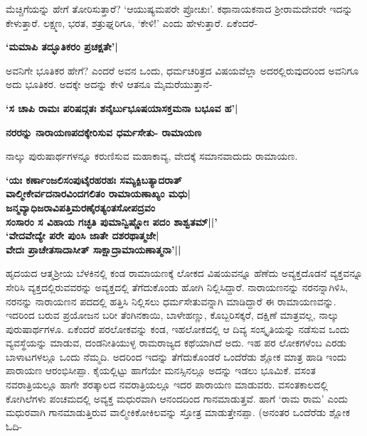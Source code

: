 ಮೆಚ್ಚಿಗೆಯನ್ನು ಹೇಗೆ ತೋರಿಸುತ್ತಾರೆ? `ಆಯುಷ್ಯಮಪರೇ ಪ್ರೋಚುಃ'. ಕಥಾನಾಯಕನಾದ ಶ್ರೀರಾಮದೇವರೇ ಇದನ್ನು ಕೇಳುತ್ತಾರೆ. ಲಕ್ಷ್ಮಣ, ಭರತ, ಶತ್ರುಘ್ನರಿಗೂ, `ಕೇಳಿ!' ಎಂದು ಹೇಳುತ್ತಾರೆ. ಏಕೆಂದರೆ- 


\begin{center} 

{\bf `ಮಮಾಪಿ ತದ್ಭೂತಿಕರಂ ಪ್ರಚಕ್ಷತೇ'|} 

\end{center} 


ಅವನಿಗೇ ಭೂತಿಕರ ಹೇಗೆ? ಎಂದರೆ ಅವನ ಒಂದು, ಧರ್ಮಚರಿತ್ರದ ವಿಷಯವೆಲ್ಲಾ ಅದರಲ್ಲಿರುವುದರಿಂದ ಅವನಿಗೂ ಅದು ಭೂತಿಕರ. ಅದಕ್ಕೇ ಅದನ್ನು ಕೇಳಿ ಆತನೂ ಮೈಮರೆಯುತ್ತಾನೆ- 


\begin{center} 

{\bf `ಸ ಚಾಪಿ ರಾಮಃ ಪರಿಷದ್ಗತಃ ಶನೈರ್ಬುಭೂಷಯಾಸಕ್ತಮನಾ ಬಭೂವ ಹ'|} 

\end{center} 


{\bf ನರರನ್ನು ನಾರಾಯಣಪದಕ್ಕೇರಿಸುವ ಧರ್ಮಸೇತು- ರಾಮಾಯಣ} 


ನಾಲ್ಕು ಪುರುಷಾರ್ಥಗಳನ್ನೂ ಕರುಣಿಸುವ ಮಹಾಕಾವ್ಯ, ವೇದಕ್ಕೆ ಸಮಾನವಾದುದು ರಾಮಾಯಣ. 


\begin{center} 

{\bf `ಯಃ ಕರ್ಣಾಂಜಲಿಸಂಪುಟೈರಹರಹಃ ಸಮ್ಯಕ್ಪಿಬತ್ಯಾದರಾತ್‍\\ 

ವಾಲ್ಮೀಕೇರ್ವದನಾರವಿಂದಗಲಿತಂ ರಾಮಾಯಣಾಖ್ಯಂ ಮಧು|\\ 

ಜನ್ಮವ್ಯಾಧಿಜರಾವಿಪತ್ತಿಮರಣೈರತ್ಯಂತಸೋಪದ್ರವಂ\\ 

ಸಂಸಾರಂ ಸ ವಿಹಾಯ ಗಚ್ಛತಿ ಪುಮಾನ್ವಿಷ್ಣೋಃ ಪದಂ ಶಾಶ್ವತಮ್‍||'\\ 

`ವೇದವೇದ್ಯೇ ಪರೇ ಪುಂಸಿ ಜಾತೇ ದಶರಥಾತ್ಮಜೇ|\\ 

ವೇದಃ ಪ್ರಾಚೇತಸಾದಾಸೀತ್‍ ಸಾಕ್ಷಾದ್ರಾಮಾಯಣಾತ್ಮನಾ'||} 

\end{center} 


ಹೃದಯದ ಆತ್ಮಶ್ರೀಯ ಬೆಳಕಿನಲ್ಲಿ ಕಂಡ ರಾಮಾಯಣಕ್ಕೆ ಲೋಕದ ವಿಷಯವನ್ನೂ ಹೆಣೆದು ಅವ್ಯಕ್ತದೊಡನೆ ವ್ಯಕ್ತವನ್ನೂ ಸೇರಿಸಿ ವ್ಯಕ್ತದಲ್ಲಿರುವವರನ್ನು ಅವ್ಯಕ್ತದಲ್ಲಿ ತೆಗೆದುಕೊಂಡು ಹೋಗಿ ನಿಲ್ಲಿಸಿದ್ದಾರೆ. ನಾರಾಯಣನನ್ನು ನರನನ್ನಾಗಿಳಿಸಿ, ನರನನ್ನು ನಾರಾಯಣನ ಪದದಲ್ಲಿ ಹತ್ತಿಸಿ ನಿಲ್ಲಿಸಲು ಧರ್ಮಸೇತುವನ್ನಾಗಿ ಮಾಡಿದ್ದಾರೆ ಈ ರಾಮಾಯಣವನ್ನು. ಇದರಿಂದ ಬರುವ ಪ್ರಯೋಜನ ಬರೀ ತೆಂಗಿನಕಾಯಿ, ಬಾಳೇಹಣ್ಣು, ಕೊಬ್ಬರಿಸಕ್ಕರೆ, ದಕ್ಷಿಣೆ ಮಾತ್ರವಲ್ಲ, ನಾಲ್ಕು ಪುರುಷಾರ್ಥಗಳೂ. ಏಕೆಂದರೆ ಪರಲೋಕವನ್ನು ಕಂಡ, ಇಹಲೋಕದಲ್ಲಿ ಆ ದಿವ್ಯ ಸಂಸ್ಕೃತಿಯನ್ನು ನಡೆಸುವ ಒಂದು ವ್ಯವಸ್ಥೆಯನ್ನು ಮಾಡುವ, ದಂಡನೀತಿಯುಳ್ಳ ರಾಮರಾಜ್ಯದ ಕಥೆಯಾಗಿದೆ ಅದು. ಇಹ ಪರ ಲೋಕಗಳೆಂಬ ಎರಡು ಬಾಳಾಟಗಳಲ್ಲೂ ಒಂದು ನೆಮ್ಮದಿ. ಅದರಿಂದ ಇದನ್ನು ತೆಗೆದುಕೊಂಡರೆ ಒಂದೆರೆಡು ಶ್ಲೋಕ ಮಾತ್ರ ಹಾಡಿ ಇಂದು ಪಾರಾಯಣ ಆರಂಭಿಸೀಪ್ಪಾ. ಕೈಯಲ್ಲಿಟ್ಟು ಹಾಗೆಯೇ ಮನಸ್ಸಿನಲ್ಲೂ ಅದನ್ನು ಇಡಲು ಭೂಮಿಕೆ. ವಸಂತ ನವರಾತ್ರಿಯಲ್ಲೂ ಹಾಗೇ ಶರತ್ಕಾಲದ ನವರಾತ್ರಿಯಲ್ಲೂ ಇದರ ಪಾರಾಯಣ ಮಾಡುವರು. ವಸಂತಕಾಲದಲ್ಲಿ ಕೋಗಿಲೆಗಳು ಪಂಚಮದಲ್ಲಿ ಅವ್ಯಕ್ತ ಮಧುರವಾಗಿ ಆನಂದದಿಂದ ಗಾನಮಾಡುತ್ತವೆ. ಹಾಗೆ `ರಾಮ ರಾಮ' ಎಂದು ಮಧುರವಾಗಿ ಗಾನಮಾಡುತ್ತಿರುವ ವಾಲ್ಮೀಕಿಕೋಕಿಲವನ್ನು ಸ್ತೋತ್ರ ಮಾಡುತ್ತೇನಪ್ಪಾ. (ಅನಂತರ ಒಂದೆರೆಡು ಶ್ಲೋಕ ಓದಿ- 


